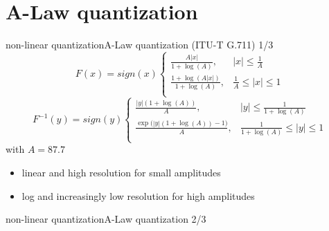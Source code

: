 \section[A-law]{A-Law quantization}
	\begin{frame}{non-linear quantization}{A-Law quantization  (ITU-T G.711) 1/3}
		\begin{equation*}
			F(x)	= sign(x)\left\lbrace
					\begin{array}{ll} 
			          \frac{A|x|}{1+\log(A)}, & |x| \leq \frac{1}{A}\\ 
			          \frac{1+\log(A|x|)}{1+\log(A)}, & \frac{1}{A} \leq |x| \leq 1\\ 
          			\end{array} 
          			\right.
		\end{equation*}
        \bigskip
		\begin{equation*}
			F^{-1}(y)	= sign(y)\left\lbrace
					\begin{array}{ll} 
			          \frac{|y|(1+\log(A))}{A}, & |y| \leq \frac{1}{1+\log(A)}\\ 
			          \frac{\exp\big(|y|(1+\log(A))-1\big)}{A}, & \frac{1}{1+\log(A)} \leq |y| \leq 1\\ 
          			\end{array} 
          			\right.
		\end{equation*}
		\bigskip
		\bigskip
        with $A = 87.7$
        
        \pause
        \begin{itemize}
            \item   linear and high resolution for small amplitudes
            \item   log and increasingly low resolution for high amplitudes
        \end{itemize}
	\end{frame}	

	\begin{frame}{non-linear quantization}{A-Law quantization 2/3}
	\end{frame}


